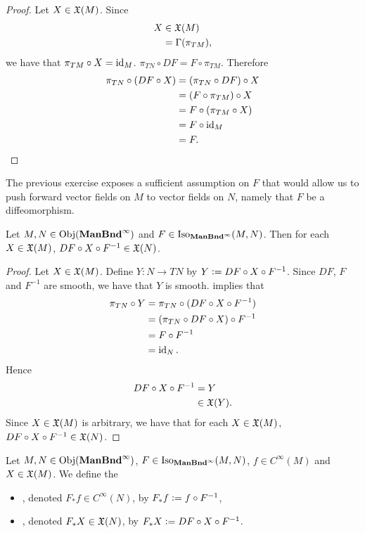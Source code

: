 \documentclass{book}
\begin{document}
\begin{proof}
	Let $X \in \mathfrak{X}(M)$. Since  
	\begin{align*}
		X 
		& \in \mathfrak{X}(M) \\
		& = \Gamma(\pi_{TM}),
	\end{align*}
	we have that $\pi_{TM} \circ X = \operatorname{id}_M$.  $\pi_{TN} \circ DF = F \circ \pi_{TM}$. Therefore
	\begin{align*}
		\pi_{TN} \circ (DF \circ X) 
		& = (\pi_{TN} \circ DF) \circ X \\
		& = (F \circ \pi_{TM}) \circ X \\
		& = F \circ (\pi_{TM} \circ X) \\
		& = F \circ \operatorname{id}_M \\
		& = F. 
	\end{align*}
\end{proof}

The previous exercise exposes a sufficient assumption on $F$ that would allow us to push forward vector fields on $M$ to vector fields on $N$, namely that $F$ be a diffeomorphism. 

\begin{ex}
	Let $M, N \in \operatorname{Obj}(\operatorname*{\text{\textbf{ManBnd}}^{\infty}})$ and $F \in \operatorname{Iso}_{\operatorname*{\text{\textbf{ManBnd}}^{\infty}}}(M, N)$. Then for each $X \in \mathfrak{X}(M)$, $DF \circ X \circ F^{-1} \in \mathfrak{X}(N)$.
\end{ex}

\begin{proof}
	Let $X \in \mathfrak{X}(M)$. Define $Y: N \rightarrow TN$ by $Y \vcentcolon= DF \circ X \circ F^{-1}$. Since $DF$, $F$ and $F^{-1}$ are smooth, we have that $Y$ is smooth.  implies that 
	\begin{align*}
		\pi_{TN} \circ Y
		& = \pi_{TN} \circ (DF \circ X \circ F^{-1}) \\
		& = (\pi_{TN} \circ DF \circ X) \circ F^{-1} \\
		& = F \circ F^{-1} \\
		& = \operatorname{id}_N.
	\end{align*}
	Hence  
	\begin{align*}
		DF \circ X \circ F^{-1}
		& = Y \\
		& \in \mathfrak{X}(Y).
	\end{align*}
	Since $X \in \mathfrak{X}(M)$ is arbitrary, we have that for each $X \in \mathfrak{X}(M)$, $DF \circ X \circ F^{-1} \in \mathfrak{X}(N)$. 
\end{proof}

\begin{defn}
	Let $M, N \in \operatorname{Obj}(\operatorname*{\text{\textbf{ManBnd}}^{\infty}})$, $F \in \operatorname{Iso}_{\operatorname*{\text{\textbf{ManBnd}}^{\infty}}}(M, N)$, $f \in C^{\infty}(M)$ and $X \in \mathfrak{X}(M)$. We define the 
	\begin{itemize}
		\item {}, denoted $F_*f \in C^{\infty}(N)$, by $F_*f \vcentcolon= f \circ F^{-1}$,
		\item {}, denoted $F_*X \in \mathfrak{X}(N)$, by $F_*X \vcentcolon= DF \circ X \circ F^{-1}$.
	\end{itemize}
\end{defn}
\end{document}
